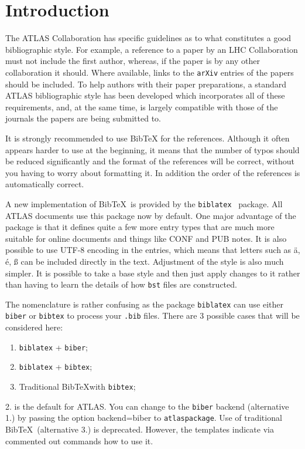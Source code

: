 \documentclass[UKenglish,texlive=2013]{latex/atlasdoc}
\author{Ian C. Brock}
\affil{University of Bonn}
\newcommand*{\BibTeX}{Bib\TeX}
\newcommand{\Option}[1]{\textsf{#1}\xspace}
\newcommand{\Package}[1]{\texttt{#1}\xspace}
\begin{document}
 


\section{Introduction}

The ATLAS Collaboration has specific guidelines as to what constitutes a good bibliographic style. 
For example, a reference to a paper by an LHC Collaboration must not include the first author,
whereas, if the paper is by any other collaboration it should. 
Where available, links to the \texttt{arXiv} entries of the papers should be included. 
To help authors with their paper preparations,
a standard ATLAS bibliographic style has been developed which incorporates all of these requirements, 
and, at the same time, is largely compatible with those of the journals the papers are being submitted to. 

It is strongly recommended to use \BibTeX{} for the references. 
Although it often appears harder to use at the beginning, it means that the number of
typos should be reduced significantly and the format of the references
will be correct, without you having to worry about formatting it.
In addition the order of the references is automatically correct.

A new implementation of \BibTeX\ is provided by the \Package{biblatex}~\cite{biblatex} package.
All ATLAS documents use this package now by default.
One major advantage of the package is that it defines quite a few more entry types
that are much more suitable for online documents and things like CONF and PUB notes.
It is also possible to use UTF-8 encoding in the entries, which means that letters such as
ä, é, ß can be included directly in the text.
Adjustment of the style is also much simpler.
It is possible to take a base style and then just apply changes to it rather than
having to learn the details of how \texttt{bst} files are constructed.

The nomenclature is rather confusing as the package \Package{biblatex} can use
either \texttt{biber} or \texttt{bibtex} to process your \texttt{.bib} files.
There are 3 possible cases that will be considered here:
\begin{enumerate}\setlength{\itemsep}{0pt}\setlength{\parskip}{0pt}
  \item \texttt{biblatex} + \texttt{biber};
  \item \texttt{biblatex} + \texttt{bibtex};
  \item Traditional \BibTeX with \texttt{bibtex};
\end{enumerate}
2. is the default for ATLAS. You can change to the \texttt{biber} backend (alternative 1.) by passing the option
\Option{backend=biber} to \Package{atlaspackage}. 
Use of traditional \BibTeX\ (alternative 3.) is deprecated.
However, the templates indicate via commented out commands how to use it.
\end{document}

